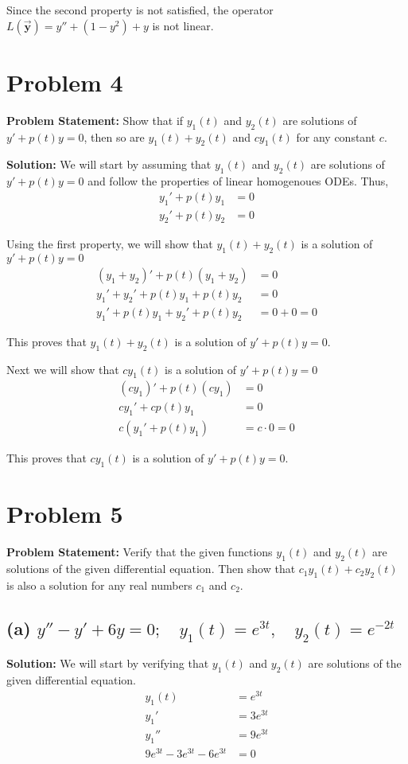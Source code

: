 \documentclass[12pt, letterpaper]{article}
\begin{document}
Since the second property is not satisfied, the operator $L(\vec{\textbf{y}}) = y'' + (1-y^2) + y$ is not linear.

\section*{Problem 4}
\textbf{Problem Statement:} Show that if $y_1(t)$ and $y_2(t)$ are solutions of $y' + p(t)y = 0$, then so are $y_1(t) + y_2(t)$ and $cy_1(t)$ for any constant $c$.

\textbf{Solution:} We will start by assuming that $y_1(t)$ and $y_2(t)$ are solutions of $y' + p(t)y = 0$ and follow the properties of linear homogenoues ODEs. Thus,
\begin{align*}
    y_1' + p(t)y_1 &= 0 \\
    y_2' + p(t)y_2 &= 0
\end{align*}

Using the first property, we will show that $y_1(t) + y_2(t)$ is a solution of $y' + p(t)y = 0$
\begin{align*}
    (y_1 + y_2)' + p(t)(y_1 + y_2) &= 0 \\
    y_1' + y_2' + p(t)y_1 + p(t)y_2 &= 0 \\
    y_1' + p(t)y_1 + y_2' + p(t)y_2 &= 0 + 0 = 0 
\end{align*}

This proves that $y_1(t) + y_2(t)$ is a solution of $y' + p(t)y = 0$. 

Next we will show that $cy_1(t)$ is a solution of $y' + p(t)y = 0$
\begin{align*}
    (cy_1)' + p(t)(cy_1) &= 0 \\
    cy_1' + cp(t)y_1 &= 0 \\
    c(y_1' + p(t)y_1) &= c \cdot 0 = 0 
\end{align*}

This proves that $cy_1(t)$ is a solution of $y' + p(t)y = 0$.

\section*{Problem 5}
\textbf{Problem Statement:} Verify that the given functions $y_1(t)$ and $y_2(t)$ are solutions of the given differential equation. Then show that $c_1y_1(t) + c_2y_2(t)$ is also a solution for any real numbers $c_1$ and $c_2$.
\subsection*{(a) $y'' - y' + 6y = 0; \quad y_1(t) = e^{3t}, \quad y_2(t) = e^{-2t}$}
\textbf{Solution:} We will start by verifying that $y_1(t)$ and $y_2(t)$ are solutions of the given differential equation.
\begin{align*}
    y_1(t) &= e^{3t} \\
    y_1' &= 3e^{3t} \\
    y_1'' &= 9e^{3t} \\
    9e^{3t} - 3e^{3t} - 6e^{3t} &= 0
\end{align*}
\end{document}

